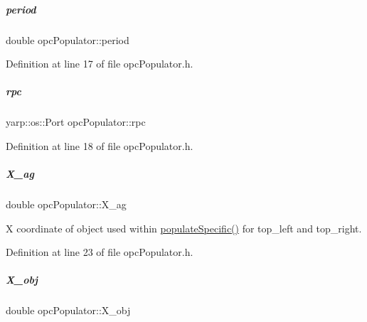 \mbox{\label{group__opcPopulator_a899c2fd9b44a6d91bae7e393dab25301}} 
\subparagraph{\texorpdfstring{period}{period}}
{\footnotesize\ttfamily double opc\+Populator\+::period\hspace{0.3cm}{\ttfamily [protected]}}



Definition at line 17 of file opc\+Populator.\+h.

\mbox{\label{group__opcPopulator_a7e160f62f4024857d8175ac8292bc0e6}} 
\subparagraph{\texorpdfstring{rpc}{rpc}}
{\footnotesize\ttfamily yarp\+::os\+::\+Port opc\+Populator\+::rpc\hspace{0.3cm}{\ttfamily [protected]}}



Definition at line 18 of file opc\+Populator.\+h.

\mbox{\label{group__opcPopulator_ab1ea488289622582f9f3ffaeb39845cf}} 
\subparagraph{\texorpdfstring{X\+\_\+ag}{X\_ag}}
{\footnotesize\ttfamily double opc\+Populator\+::\+X\+\_\+ag\hspace{0.3cm}{\ttfamily [protected]}}



X coordinate of object used within \hyperlink{group__opcPopulator_a0fba845edd63a15da94b864022d20ba3}{populate\+Specific()} for top\+\_\+left and top\+\_\+right. 



Definition at line 23 of file opc\+Populator.\+h.

\mbox{\label{group__opcPopulator_a5eb44c3b76f843da34dde2cf8976ddaf}} 
\subparagraph{\texorpdfstring{X\+\_\+obj}{X\_obj}}
{\footnotesize\ttfamily double opc\+Populator\+::\+X\+\_\+obj\hspace{0.3cm}{\ttfamily [protected]}}



